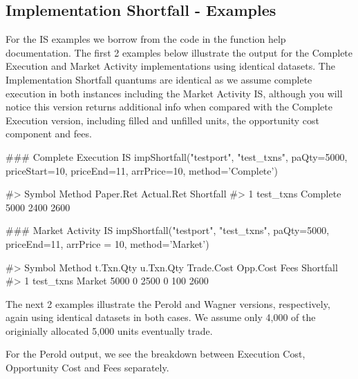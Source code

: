 \hypertarget{implementation-shortfall---examples}{%
\subsection{Implementation Shortfall -
Examples}\label{implementation-shortfall---examples}}

For the IS examples we borrow from the code in the function help
documentation. The first 2 examples below illustrate the output for the
Complete Execution and Market Activity implementations using identical
datasets. The Implementation Shortfall quantums are identical as we
assume complete execution in both instances including the Market
Activity IS, although you will notice this version returns additional
info when compared with the Complete Execution version, including filled
and unfilled units, the opportunity cost component and fees.

\begin{Schunk}
\begin{Sinput}
### Complete Execution IS
impShortfall("testport", "test_txns",
          paQty=5000,
          priceStart=10,
          priceEnd=11,
          arrPrice=10,
          method='Complete')
\end{Sinput}
\begin{Soutput}
#>      Symbol   Method Paper.Ret Actual.Ret Shortfall
#> 1 test_txns Complete      5000       2400      2600
\end{Soutput}
\end{Schunk}

\begin{Schunk}
\begin{Sinput}
### Market Activity IS
impShortfall("testport", "test_txns",
          paQty=5000, 
          priceEnd=11,
          arrPrice = 10,
          method='Market')
\end{Sinput}
\begin{Soutput}
#>      Symbol Method t.Txn.Qty u.Txn.Qty Trade.Cost Opp.Cost Fees Shortfall
#> 1 test_txns Market      5000         0       2500        0  100      2600
\end{Soutput}
\end{Schunk}

The next 2 examples illustrate the Perold and Wagner versions,
respectively, again using identical datasets in both cases. We assume
only 4,000 of the originially allocated 5,000 units eventually trade.

For the Perold output, we see the breakdown between Execution Cost,
Opportunity Cost and Fees separately.

